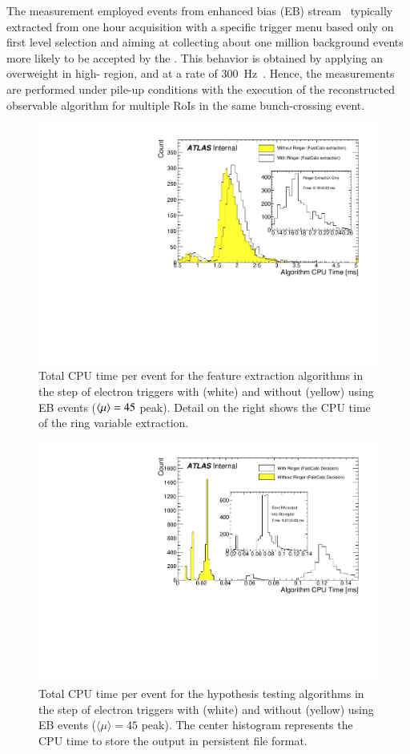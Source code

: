The measurement employed events from enhanced bias (EB)
stream~\cite{eb_description} typically extracted from one hour acquisition with
a specific trigger menu based only on first level selection and aiming at
collecting about one million background events more likely to be accepted by the
\hlt{}. This behavior is obtained by applying an overweight in high-\pt{} region,
and at a rate of \SI{300}{\hertz}~\cite{eb_specifications}. Hence, the
measurements are performed under pile-up conditions with the execution of the
reconstructed observable algorithm for multiple RoIs in the same bunch-crossing event.


\begin{figure}[h!tb]
	\includegraphics[width=.7\textwidth]{sections/05_analysis/figures/EgammaFex_TotalTime}
	\centering
	\caption{\label{fig:fastcalo_fex_time}
		Total CPU time per event for the feature extraction algorithms in the \fastcalo step of electron triggers with (white) and without (yellow) \rnn{} using EB events ($\langle \mu \rangle=45$ peak). Detail on the right shows the CPU time of the ring variable extraction.  
	}
\end{figure}

\begin{figure}[h!tb]
	\includegraphics[width=.7\textwidth]{sections/05_analysis/figures/EgammaHypo_TotalTime.pdf}
	\centering
	\caption{\label{fig:fastcalo_hypo_time}
		Total CPU time per event for the hypothesis testing algorithms
		in the \fastcalo step of electron triggers with (white) and without (yellow) \rnn{} using EB events ($\langle \mu \rangle = 45$ peak). The center histogram represents the CPU time to store the \rnn{} output in persistent file format.}
\end{figure}

